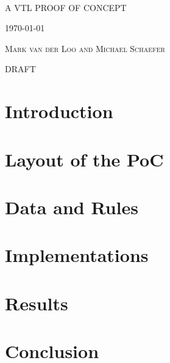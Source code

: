 \documentclass[fancyheadings,11pt]{book}
\begin{document}
\begin{center}
\thispagestyle{empty}
 \ \ \

\bigskip
\bigskip

{\huge
\textsc{A VTL PROOF OF CONCEPT}
}

\vspace{0.5 cm}
\textsc{\today}

\vspace{1.8 cm}
\textsc{\Large Mark van der Loo and Michael Schaefer}

\vspace{2 cm}
\textsc{\Large DRAFT}

\end{center}

\newpage
\thispagestyle{empty}

\frontmatter
\tableofcontents

%

\mainmatter

\chapter{Introduction}
\label{introduction}


\chapter{Layout of the PoC}
\label{layoutpoc}
\noindent


\chapter{Data and Rules}
\label{datarules}
\noindent


\chapter{Implementations}
\label{implementations}
\noindent


\chapter{Results}
\label{results}
\noindent


\chapter{Conclusion}
\label{conclusion}
\noindent


\backmatter


%



\end{document}
